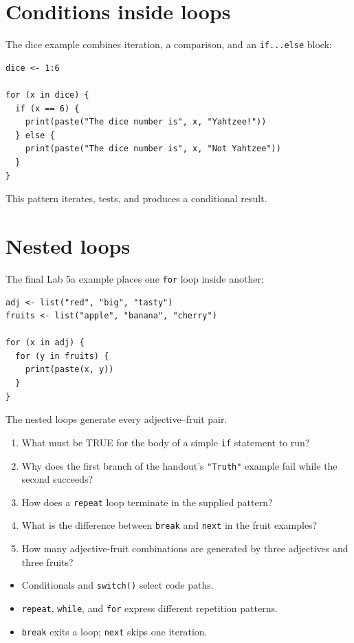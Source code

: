 \section{Conditions inside loops}

The dice example combines iteration, a comparison, and an \texttt{if...else} block:

\begin{lstlisting}[style=dsr]
dice <- 1:6

for (x in dice) {
  if (x == 6) {
    print(paste("The dice number is", x, "Yahtzee!"))
  } else {
    print(paste("The dice number is", x, "Not Yahtzee"))
  }
}
\end{lstlisting}

This pattern iterates, tests, and produces a conditional result.

\section{Nested loops}

The final Lab 5a example places one \texttt{for} loop inside another:

\begin{lstlisting}[style=dsr]
adj <- list("red", "big", "tasty")
fruits <- list("apple", "banana", "cherry")

for (x in adj) {
  for (y in fruits) {
    print(paste(x, y))
  }
}
\end{lstlisting}

The nested loops generate every adjective--fruit pair.

\begin{quickcheck}
\begin{enumerate}
  \item What must be TRUE for the body of a simple \texttt{if} statement to run?
  \item Why does the first branch of the handout's \texttt{"Truth"} example fail while the second succeeds?
  \item How does a \texttt{repeat} loop terminate in the supplied pattern?
  \item What is the difference between \texttt{break} and \texttt{next} in the fruit examples?
  \item How many adjective-fruit combinations are generated by three adjectives and three fruits?
\end{enumerate}
\end{quickcheck}

\begin{chapterrecap}
\begin{itemize}
  \item Conditionals and \texttt{switch()} select code paths.
  \item \texttt{repeat}, \texttt{while}, and \texttt{for} express different repetition patterns.
  \item \texttt{break} exits a loop; \texttt{next} skips one iteration.
\end{itemize}
\end{chapterrecap}
